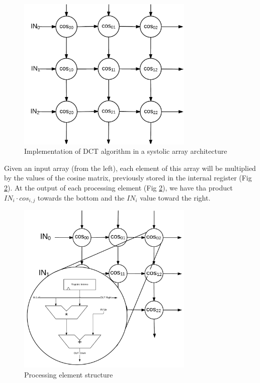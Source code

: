  \begin{figure}[h!]
 	\centering
 	 	\includegraphics[width=0.75\textwidth]{imm/dct/dct_sa1.png}  
 	\caption{Implementation of DCT algorithm in a systolic array architecture} 
 	\label{fig:dct_sa1}
 \end{figure}
 
 Given an input array (from the left), each element of this array will be multiplied by the values of the cosine matrix, previously stored in the internal register (Fig \ref{fig:dct_sa2}).
 At the output of each processing element (Fig \ref{fig:dct_sa2}), we have tha product $ IN_{i}\cdot cos_{i,j} $ towards the bottom and the $ IN_{i} $ value toward the right.
 
  \begin{figure}[h!]
  	\centering
  	  	\includegraphics[width=0.75\textwidth]{imm/dct/dct_sa2.png}  
  	\caption{Processing element structure} 
  	\label{fig:dct_sa2}
  \end{figure}
   
